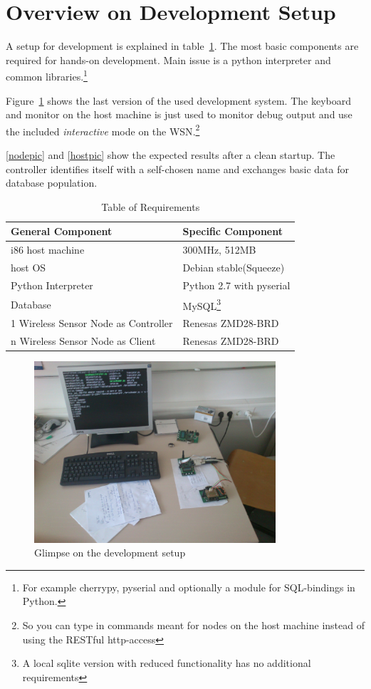 \section{Overview on Development Setup}

A setup for development is explained in table~\ref{tab:requirements}. The most basic components are 
required for hands-on development. Main issue is a python interpreter and common libraries.\footnote{For example
cherrypy, pyserial and optionally a module for SQL-bindings in Python.}

Figure~\ref{setupic} shows the last version of the used development system. The keyboard and monitor on the host machine
is just used to monitor debug output and use the included \textsl{interactive} mode on the \textsc{WSN}.\footnote{So you can 
type in commands meant for nodes on the host machine instead of using the RESTful http-access}

\ref{nodepic} and \ref{hostpic} show the expected results after a clean startup. The controller identifies itself with a
self-chosen name and exchanges basic data for database population.
 

\begin{table}[h] 
\centering 
\begin{tabular}{|l||l|} 
General Component & Specific Component\\ 
\hline 
i86 host machine & 300MHz, 512MB\\ 
host OS & Debian stable(Squeeze) \\ 
Python Interpreter & Python 2.7 with pyserial \\ 
Database & MySQL\footnote{A local sqlite version with reduced functionality has no additional requirements} \\ 
1 Wireless Sensor Node as Controller & Renesas ZMD28-BRD \\
n Wireless Sensor Node as Client & Renesas ZMD28-BRD \\ 
\end{tabular} 
\caption{ Table of Requirements} 
\label{tab:requirements} 
\end{table}


\begin{figure}[H]
   \centering
   \includegraphics[width=0.8\textwidth]{pic/whole_setup.jpg}%
   \caption{Glimpse on the development setup}
   \label{setupic}%
\end{figure}

